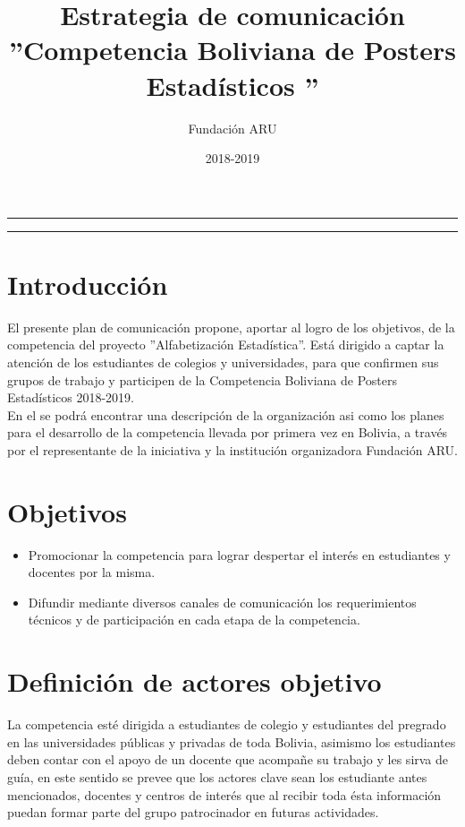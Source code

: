 \documentclass{article}
\title{\textbf{Estrategia de comunicación} \\ ''Competencia Boliviana de Posters Estadísticos ''}
\author{Fundación ARU}
\date{2018-2019 }
\begin{document}
\maketitle

\hrule
\hrule
\newpage

\section{Introducción}

El presente plan de comunicación propone, aportar al logro de los objetivos, de la competencia del proyecto ''Alfabetización Estadística''. Está dirigido a captar la atención de los estudiantes de colegios y universidades, para que confirmen sus grupos de trabajo y participen de la Competencia Boliviana de Posters Estadísticos 2018-2019.\\

En el se podrá encontrar una descripción de la organización asi como los planes para el desarrollo de la competencia llevada por primera vez en Bolivia, a través por el representante de la iniciativa y la institución organizadora Fundación ARU.


\section{Objetivos}


\begin{itemize}
\item Promocionar la competencia para lograr despertar el interés en estudiantes y docentes por la misma. 

\item Difundir mediante diversos canales de comunicación los requerimientos técnicos y de participación en cada etapa de la competencia.
\end{itemize} 

\section{Definición de actores objetivo}


La competencia esté dirigida a estudiantes de colegio y estudiantes del pregrado en las universidades públicas y privadas de toda Bolivia, asimismo los estudiantes deben contar con el apoyo de un docente que acompañe su trabajo y les sirva de guía, en este sentido se prevee que los actores clave sean los estudiante antes mencionados, docentes y centros de interés que al recibir toda ésta información puedan formar parte del grupo patrocinador en futuras actividades. 
\end{document}
